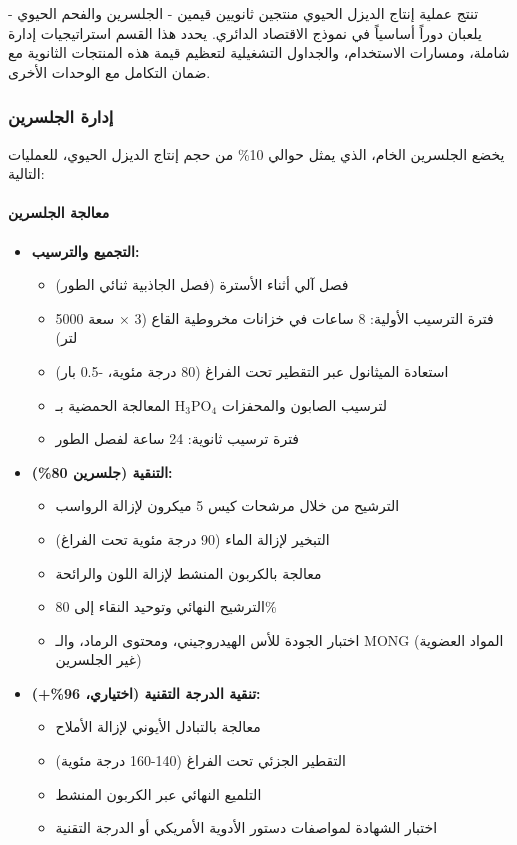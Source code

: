 تنتج عملية إنتاج الديزل الحيوي منتجين ثانويين قيمين - الجلسرين والفحم الحيوي - يلعبان دوراً أساسياً في نموذج الاقتصاد الدائري. يحدد هذا القسم استراتيجيات إدارة شاملة، ومسارات الاستخدام، والجداول التشغيلية لتعظيم قيمة هذه المنتجات الثانوية مع ضمان التكامل مع الوحدات الأخرى.

\subsubsection{إدارة الجلسرين}
\label{sec:glycerin_utilization}

يخضع الجلسرين الخام، الذي يمثل حوالي 10\% من حجم إنتاج الديزل الحيوي، للعمليات التالية:

\paragraph{معالجة الجلسرين}
\begin{itemize}
    \item \textbf{التجميع والترسيب:}
    \begin{itemize}
        \item فصل آلي أثناء الأسترة (فصل الجاذبية ثنائي الطور)
        \item فترة الترسيب الأولية: 8 ساعات في خزانات مخروطية القاع (3 × سعة 5000 لتر)
        \item استعادة الميثانول عبر التقطير تحت الفراغ (80 درجة مئوية، -0.5 بار)
        \item المعالجة الحمضية بـ H$_3$PO$_4$ لترسيب الصابون والمحفزات
        \item فترة ترسيب ثانوية: 24 ساعة لفصل الطور
    \end{itemize}
    
    \item \textbf{التنقية (جلسرين 80\%):}
    \begin{itemize}
        \item الترشيح من خلال مرشحات كيس 5 ميكرون لإزالة الرواسب
        \item التبخير لإزالة الماء (90 درجة مئوية تحت الفراغ)
        \item معالجة بالكربون المنشط لإزالة اللون والرائحة
        \item الترشيح النهائي وتوحيد النقاء إلى 80\%
        \item اختبار الجودة للأس الهيدروجيني، ومحتوى الرماد، والـ MONG (المواد العضوية غير الجلسرين)
    \end{itemize}
    
    \item \textbf{تنقية الدرجة التقنية (اختياري، 96\%+):}
    \begin{itemize}
        \item معالجة بالتبادل الأيوني لإزالة الأملاح
        \item التقطير الجزئي تحت الفراغ (140-160 درجة مئوية)
        \item التلميع النهائي عبر الكربون المنشط
        \item اختبار الشهادة لمواصفات دستور الأدوية الأمريكي أو الدرجة التقنية
    \end{itemize}
\end{itemize}

